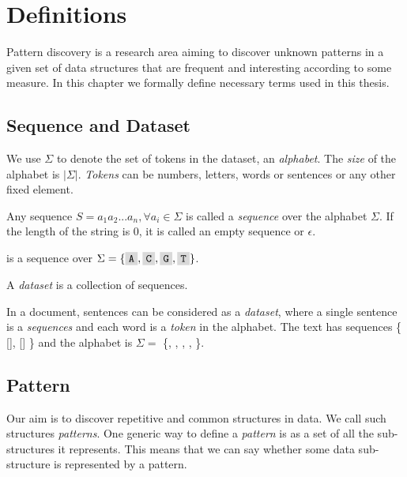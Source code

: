 \chapter{Definitions}
\label{c:definitions}

Pattern discovery is a research area aiming to discover unknown patterns in a given set of data structures that are frequent and interesting according to some measure. In this chapter we formally define necessary terms used in this thesis.

\section{Sequence and Dataset}

We use $\Sigma$ to denote the set of tokens in the dataset, an \emph{alphabet}. The \emph{size} of the alphabet is $|\Sigma|$. \emph{Tokens} can be numbers, letters, words or sentences or any other fixed element.

Any sequence $S=a_1 a_2 ... a_n, \forall a_i \in \Sigma$ is called a \emph{sequence} over the alphabet $\Sigma$. If the length of the string is $0$, it is called an empty sequence or $\epsilon$.

\begin{exmp}
 is a sequence over $\Sigma = \{\R{A}, \R{C}, \R{G}, \R{T}\}$.
\end{exmp}

A \emph{dataset} is a collection of sequences.

\begin{exmp}
In a document, sentences can be considered as a \emph{dataset}, where a single sentence is a \emph{sequences} and each word is a \emph{token} in the alphabet. The text  has sequences \{ [], [] \} and the alphabet is $\Sigma =$ \{, , , , \}.	
\end{exmp}

\section{Pattern}

Our aim is to discover repetitive and common structures in data. We call such structures \emph{patterns}. One generic way to define a \emph{pattern} is as a set of all the sub-structures it represents. This means that we can say whether some data sub-structure is represented by a pattern.

